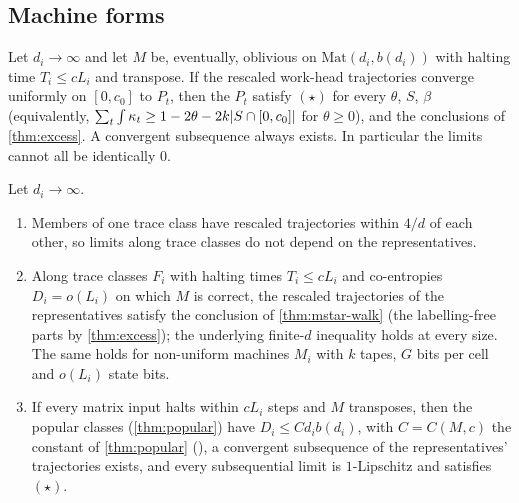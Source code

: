 \subsection{Machine forms}

\begin{theorem}\label{thm:mstar}
Let $d_i\to\infty$ and let $M$ be, eventually, oblivious on $\mathrm{Mat}(d_i,b(d_i))$ with halting
time $T_i\le cL_i$ and transpose. If the rescaled work-head trajectories converge uniformly on
$[0,c_0]$ to $P_t$, then the $P_t$ satisfy $(\star)$ for every $\theta$, $S$, $\beta$ (equivalently,
$\sum_t\int\kappa_t\ge1-2\theta-2k\lvert S\cap[0,c_0] \rvert$ for $\theta\ge0$), and the conclusions of
\cref{thm:excess}. A convergent subsequence always exists. In particular the limits cannot all be
identically $0$.
\end{theorem}

\begin{theorem}\label{thm:mstar-adaptive}
Let $d_i\to\infty$.
\begin{enumerate}[label=(\alph*)]
\item Members of one trace class have rescaled trajectories within $4/d$ of each other, so limits
along trace classes do not depend on the representatives.
\item Along trace classes $F_i$ with halting times $T_i\le cL_i$ and co-entropies $D_i=o(L_i)$ on which $M$
is correct, the rescaled trajectories of the representatives satisfy the conclusion of \cref{thm:mstar-walk}
(the labelling-free parts by \cref{thm:excess}); the underlying finite-$d$ inequality holds at every size. The same holds for non-uniform machines
$M_i$ with $k$ tapes, $G$ bits per cell and $o(L_i)$ state bits.
\item If every matrix input halts within $cL_i$ steps and $M$ transposes, then the popular classes
(\cref{thm:popular}) have $D_i\le Cd_ib(d_i)$, with $C=C(M,c)$ the constant of \cref{thm:popular}
(), a convergent subsequence of the representatives'
trajectories exists, and every subsequential limit is $1$-Lipschitz and satisfies $(\star)$.
\end{enumerate}
\end{theorem}

